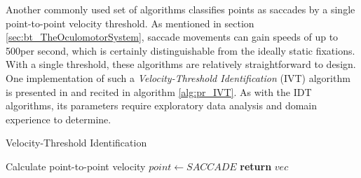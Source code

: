 Another commonly used set of algorithms classifies points as saccades by a single point-to-point velocity threshold. As mentioned in section \ref{sec:bt_TheOculomotorSystem}, saccade movements can gain speeds of up to 500\degree per second, which is certainly distinguishable from the ideally static fixations. With a single threshold, these algorithms are relatively straightforward to design. One implementation of such a \textit{Velocity-Threshold Identification} (IVT) algorithm is presented in \cite{salvucci2000} and recited in algorithm \ref{alg:pr_IVT}. As with the IDT algorithms, its parameters require exploratory data analysis and domain experience to determine. 

\begin{algorithm}
    \caption{Velocity-Threshold Identification}
    \label{alg:pr_IVT}
    \begin{algorithmic}[1]
                \State Calculate point-to-point velocity
            \EndFor
                    \State $point \gets SACCADE$
                \EndIf
            \EndFor
            \State \textbf{return} $vec$
        \EndProcedure
    \end{algorithmic}
\end{algorithm}

